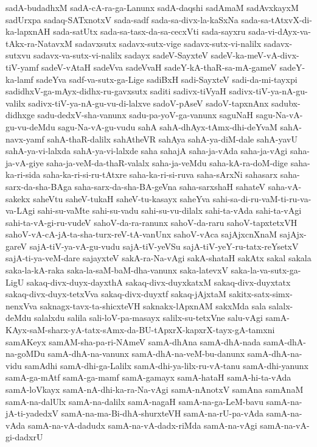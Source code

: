 {sadA-budadhxM
sadA-cA-ra-ga-Lanunx
sadA-daqshi
sadAmaM
sadAvxkayxM
sadUrxpa
sadaq-SATxnotxV
sada-sadf
sada-sa-divx-la-kaSxNa
sada-sa-tAtxvX-di-ka-lapxnAH
sada-satUtx
sada-sa-tasx-da-sa-cecxVti
sada-sayxru
sada-vi-dAyx-va-tAkx-ra-NatavxM
sadavxsutx
sadavx-sutx-vige
sadavx-sutx-vi-nalilx
sadavx-sutxvu
sadavx-va-sutx-vi-nalilx
sadayx
sadeV-SayxteV
sadeV-ka-meV-vA-divx-tiV-yamf
sadeV-vAtaH
sadeVva
sadeVvaH
sadeY-kA-thaR-sa-mA-gameV
sadeY-ka-lamf
sadeYva
sadf-va-sutx-ga-Lige
sadiBxH
sadi-SayxteV
sadi-da-mi-tayxpi
sadidhxV-ga-mAyx-didhx-ru-gavxsutx
saditi
sadivx-tiVyaH
sadivx-tiV-ya-nA-gu-valilx
sadivx-tiV-ya-nA-gu-vu-di-lalxve
sadoV-pAseV
sadoV-tapxnAnx
sadubx-didhxge
sadu-dedxV-sha-vanunx
sadu-pa-yoV-ga-vanunx
saguNaH
sagu-Na-vA-gu-vu-deMdu
sagu-Na-vA-gu-vudu
sahA
sahA-dhAyx-tAmx-dhi-deYvaM
sahA-navx-yamf
sahA-thaR-dalilx
sahAtheVR
sahAya
sahA-ya-diM-dale
sahA-yavU
sahA-ya-vi-lalxda
sahA-ya-vi-lalxde
saha
sahajA
saha-ja-vAda
saha-ja-vAgi
saha-ja-vA-giye
saha-ja-veM-da-thaR-valalx
saha-ja-veMdu
saha-kA-ra-doM-dige
saha-ka-ri-sida
saha-ka-ri-si-ru-tAtxre
saha-ka-ri-si-ruva
saha-sArxNi
sahasarx
saha-sarx-da-sha-BAga
saha-sarx-da-sha-BA-geVna
saha-sarxshaH
sahateV
saha-vA-sakekx
saheVtu
saheV-tukaH
saheV-tu-kasayx
saheYva
sahi-sa-di-ru-vaM-ti-ru-va-va-LAgi
sahi-su-vaMte
sahi-su-vadu
sahi-su-vu-dilalx
sahi-ta-vAda
sahi-ta-vAgi
sahi-ta-vA-gi-ru-vudeV
sahoV-da-ra-ranunx
sahoV-da-raru
sahoV-tapxtetxVH
sahoV-vA-cA-jA-ta-sha-turx-reV-tA-vanUnx
sahoV-vAca
sajAjxcnXnaM
sajAjx-gareV
sajA-tiV-ya-vA-gu-vudu
sajA-tiV-yeVSu
sajA-tiV-yeY-ru-tatx-reYsetxV
sajA-ti-ya-veM-dare
sajayxteV
sakA-ra-Na-vAgi
sakA-shataH
sakAtx
sakal
sakala
saka-la-kA-raka
saka-la-saM-baM-dha-vanunx
saka-latevxV
saka-la-va-sutx-ga-LigU
sakaq-divx-duyx-dayxthA
sakaq-divx-duyxkatxM
sakaq-divx-duyxtatx
sakaq-divx-duyx-tetxVva
sakaq-divx-duyxtf
sakaq-jAjxtaM
sakitx-satx-simx-nenxVva
saknagx-tavx-ta-shicxteVH
saknakx-lApxnAM
sakxMda
sala
salalx-deMdu
salalxdu
salila
sali-loV-pa-masayx
salilx-su-tetxVne
salu-vAgi
samA-KAyx-saM-sharx-yA-tatx-sAmx-da-BU-tApxrX-kapxrX-tayx-gA-tamxni
samAKeyx
samAM-sha-pa-ri-NAmeV
samA-dhAna
samA-dhA-nada
samA-dhA-na-goMDu
samA-dhA-na-vanunx
samA-dhA-na-veM-bu-danunx
samA-dhA-na-vidu
samAdhi
samA-dhi-ga-Lalilx
samA-dhi-ya-lilx-ru-vA-tanu
samA-dhi-yanunx
samA-ga-mAtf
samA-ga-mamf
samA-gamayx
samA-hataH
samA-hi-ta-vAda
samA-loVkayx
samA-nA-dhi-ka-ra-Na-vAgi
samA-nAnotxV
samAna
samAnaM
samA-na-dalUlx
samA-na-dalilx
samA-nagaH
samA-na-ga-LeM-bavu
samA-na-jA-ti-yadedxV
samA-na-ma-Bi-dhA-shurxteVH
samA-na-rU-pa-vAda
samA-na-vAda
samA-na-vA-dadudx
samA-na-vA-dadx-riMda
samA-na-vAgi
samA-na-vA-gi-dadxrU
}
